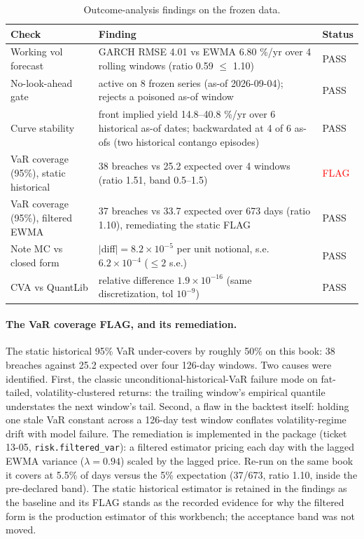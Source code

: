 \documentclass[11pt,a4paper]{article}
\begin{document}
\begin{table}[h!]
\centering\small
\begin{tabular}{p{3.2cm}p{7.8cm}p{3.6cm}}
\toprule
\textbf{Check} & \textbf{Finding} & \textbf{Status} \\
\midrule
Working vol forecast & GARCH RMSE 4.01 vs EWMA 6.80 \%/yr over 4 rolling windows (ratio 0.59 $\leq$ 1.10) & PASS \\
No-look-ahead gate & active on 8 frozen series (as-of 2026-09-04); rejects a poisoned as-of window & PASS \\
Curve stability & front implied yield 14.8--40.8 \%/yr over 6 historical as-of dates; backwardated at 4 of 6 as-ofs (two historical contango episodes) & PASS \\
VaR coverage (95\%), static historical & 38 breaches vs 25.2 expected over 4 windows (ratio 1.51, band 0.5--1.5) & \textcolor{red}{FLAG} \\
VaR coverage (95\%), filtered EWMA & 37 breaches vs 33.7 expected over 673 days (ratio 1.10), remediating the static FLAG & PASS \\
Note MC vs closed form & $|$diff$| = 8.2\times10^{-5}$ per unit notional, s.e.\ $6.2\times10^{-4}$ ($\leq 2$ s.e.) & PASS \\
CVA vs QuantLib & relative difference $1.9\times10^{-16}$ (same discretization, tol $10^{-9}$) & PASS \\
\bottomrule
\end{tabular}
\caption{Outcome-analysis findings on the frozen data.}
\end{table}

\paragraph{The VaR coverage FLAG, and its remediation.} The static
historical 95\% VaR under-covers by roughly 50\% on this book: 38 breaches
against 25.2 expected over four 126-day windows. Two causes were
identified. First, the classic unconditional-historical-VaR failure mode
on fat-tailed, volatility-clustered returns: the trailing window's
empirical quantile understates the next window's tail. Second, a flaw in
the backtest itself: holding one stale VaR constant across a 126-day test
window conflates volatility-regime drift with model failure. The
remediation is implemented in the package (ticket 13-05,
\texttt{risk.filtered\_var}): a filtered estimator pricing each day with
the lagged EWMA variance ($\lambda = 0.94$) scaled by the lagged price.
Re-run on the same book it covers at 5.5\% of days versus the 5\%
expectation (37/673, ratio 1.10, inside the pre-declared band). The
static historical estimator is retained in the findings as the baseline
and its FLAG stands as the recorded evidence for why the filtered form is
the production estimator of this workbench; the acceptance band was not
moved.
\end{document}
